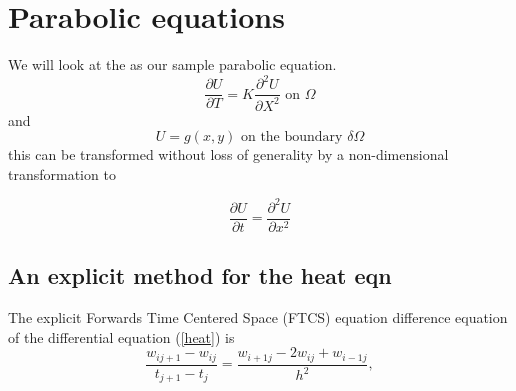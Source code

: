 \chapter{Parabolic equations}
We will look at the  as our sample parabolic equation.
\[ \frac{\partial U}{\partial T}=K\frac{\partial^2U }{\partial X^2} \mbox{ on } \Omega \]
and 
\[ U=g(x,y) \mbox{ on the boundary } \delta\Omega \]
this can be transformed without loss of generality by a non-dimensional transformation to

\begin{equation}\label{heat} \frac{\partial U}{\partial t}=\frac{\partial^2U }{\partial x^2}\end{equation}

\section{An explicit method for the heat eqn}
The explicit Forwards Time Centered Space (FTCS) equation difference equation of the differential equation (\ref{heat}) is
\begin{equation}
\frac{w_{ij+1}-w_{ij}}{t_{j+1}-t_{j}}=\frac{w_{i+1j}-2w_{ij}+w_{i-1j}}{h^2},
\end{equation}

